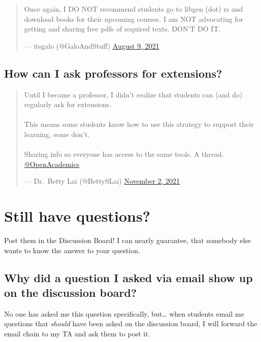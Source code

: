 \documentclass[
]{book}
\begin{document}
\begin{quote}
Once again, I DO NOT recommend students go to libgen (dot) rs and
download books for their upcoming courses. I am NOT advocating for
getting and sharing free pdfs of required texts. DON'T DO IT.

--- itsgalo (@GaloAndStuff) \href{https://twitter.com/GaloAndStuff/status/1424818560417902604}{August 9,
2021}
\end{quote}

\hypertarget{how-can-i-ask-professors-for-extensions}{%
\subsection{How can I ask professors for extensions?}\label{how-can-i-ask-professors-for-extensions}}

\begin{quote}
Until I became a professor, I didn't realize that students can (and
do) regularly ask for extensions.\\
~\\
This means some students know how to use this strategy to support
their learning, some don't.\\
~\\
Sharing info so everyone has access to the same tools. A thread.
\href{https://twitter.com/OpenAcademics}{@OpenAcademics}

--- Dr.~Betty Lai (@BettySLai) \href{https://twitter.com/BettySLai/status/1455555111397117954}{November 2,
2021}
\end{quote}

\hypertarget{still-have-questions}{%
\section{Still have questions?}\label{still-have-questions}}

Post them in the Discussion Board! I can nearly guarantee, that somebody else wants to know the answer to your question.

\hypertarget{why-did-a-question-i-asked-via-email-show-up-on-the-discussion-board}{%
\subsection{Why did a question I asked via email show up on the discussion board?}\label{why-did-a-question-i-asked-via-email-show-up-on-the-discussion-board}}

No one has asked me this question specifically, but\ldots{} when students email me questions that \emph{should} have been asked on the discussion board, I will forward the email chain to my TA and ask them to post it.
\end{document}
